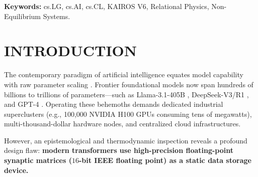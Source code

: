 \documentclass[10pt,twocolumn]{article}
\begin{document}
\begin{abstract}
4. \textbf{The 740M Invariant & Asymmetry Gap Scaling Law:} The physical footprint of the excised 7B model drops to \textbf{740 million parameters (1.38 GB in BF16 / ~370 MB in 4-bit)}, providing 7B-class deductive capacity within the hardware budget of a sub-1B micro-model. Extending this law to hyperscale architectures reveals that the compression ratio scales asymmetrically with model size: \textbf{$\times 11$ at 7B}, \textbf{$\times 42$ at 14B}, \textbf{$\times 40$ at 70B}, \textbf{$\times 101$ on Llama-3.1-405B (810 GB $\to$ 8 GB)}, and up to \textbf{$\times 200$ on 1.8T+ Mixture-of-Experts architectures (GPT-4 class, 3.6 TB $\to$ 18 GB)}.

Our findings prove that the multi-megawatt datacenters of current frontier AI are primarily burning energy to store free public text, whereas the invariant relational engine of intelligence fits comfortably on an offline, consumer-grade workstation.
\end{abstract}

\vspace{1em}
\noindent\textbf{Keywords:} cs.LG, cs.AI, cs.CL, KAIROS V6, Relational Physics, Non-Equilibrium Systems.

\vspace{1em}






\section{INTRODUCTION}

The contemporary paradigm of artificial intelligence equates model capability with raw parameter scaling \cite{Kaplan2020, Hoffmann2022}. Frontier foundational models now span hundreds of billions to trillions of parameters—such as Llama-3.1-405B \cite{Meta2024}, DeepSeek-V3/R1 \cite{DeepSeek2025}, and GPT-4 \cite{OpenAI2023}. Operating these behemoths demands dedicated industrial superclusters (e.g., 100,000 NVIDIA H100 GPUs consuming tens of megawatts), multi-thousand-dollar hardware nodes, and centralized cloud infrastructures.

However, an epistemological and thermodynamic inspection reveals a profound design flaw: \textbf{modern transformers use high-precision floating-point synaptic matrices ($16$-bit IEEE floating point) as a static data storage device.}
\end{document}
